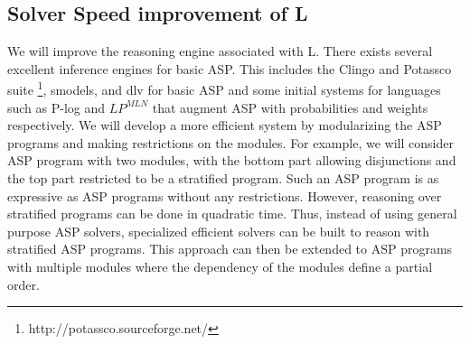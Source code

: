 
\subsection{Solver Speed improvement of L}

We will improve the reasoning engine associated with L.  There exists several excellent inference engines for basic ASP. This includes the Clingo and Potassco suite \footnote{http://potassco.sourceforge.net/}, smodels, and dlv for basic ASP and some initial systems for languages such as P-log and $LP^{MLN}$ that augment ASP with probabilities and weights respectively. We will develop a more efficient system by modularizing the ASP programs and making restrictions on the modules. For example, we will consider ASP program with two modules, with the bottom part allowing disjunctions and the top part restricted to be a stratified program.  Such an ASP program is as expressive as ASP programs without any restrictions. However, reasoning over stratified programs can be done in quadratic time. Thus, instead of using general purpose ASP solvers, specialized efficient solvers can be built to reason with stratified ASP programs. This approach can then be extended to ASP programs with multiple modules where the dependency of the modules define a partial order.  




